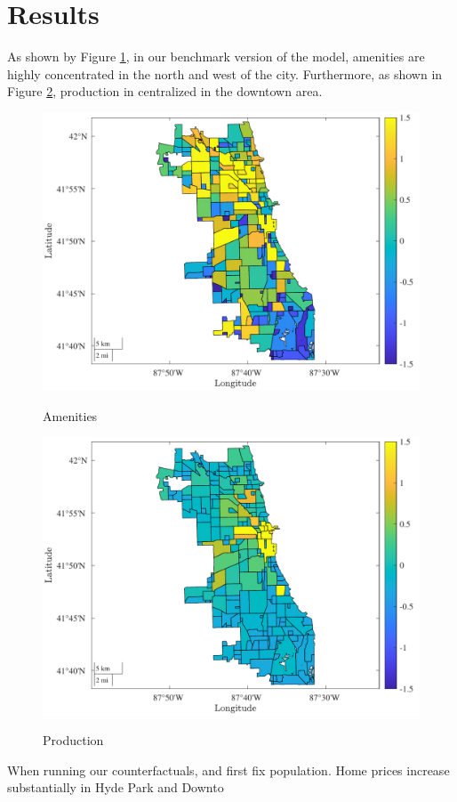 \documentclass[12pt]{article}
\begin{document}
\section{Results}
As shown by Figure \ref{fig:amenities_base}, in our benchmark version of the model, amenities are highly concentrated in the north and west of the city. Furthermore, as shown in Figure \ref{fig:prod_base}, production in centralized in the downtown area.
\begin{figure}[h]
    \centering
    \caption{Amenities}
    \includegraphics[width=.75\textwidth]{Pset1/Figures/Single Agent/Baseline/eAmenities.pdf}
    \label{fig:amenities_base}
\end{figure}  
\begin{figure}[h]
    \centering
    \caption{Production}
    \includegraphics[width=.75\linewidth]{Pset1/Figures/Single Agent/Baseline/prod.pdf}
    \label{fig:prod_base}
\end{figure}
When running our counterfactuals, and first fix population. Home prices increase substantially in Hyde Park and Downto
\end{document}
